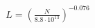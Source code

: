 \documentclass[preview]{standalone}
\begin{document}
\begin{align*}
L = \left(\frac{N}{8.8 \cdot 10^{13}}\right)^{-0.076}
\end{align*}
\end{document}
